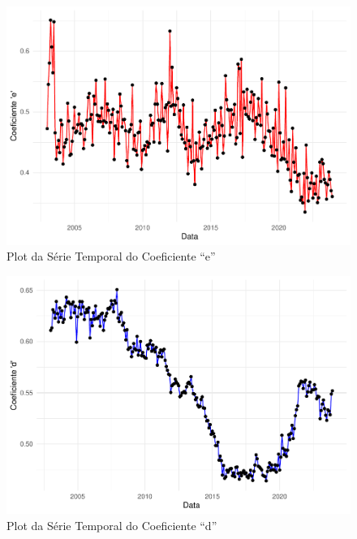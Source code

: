 \documentclass[12pt]{article}
\begin{document}
\newpage

\begin{figure}
\centering
\includegraphics{multiplicador_files/figure-latex/unnamed-chunk-6-1.pdf}
\caption{Plot da Série Temporal do Coeficiente ``e''}
\end{figure}

\begin{figure}
\centering
\includegraphics{multiplicador_files/figure-latex/unnamed-chunk-7-1.pdf}
\caption{Plot da Série Temporal do Coeficiente ``d''}
\end{figure}
\end{document}
